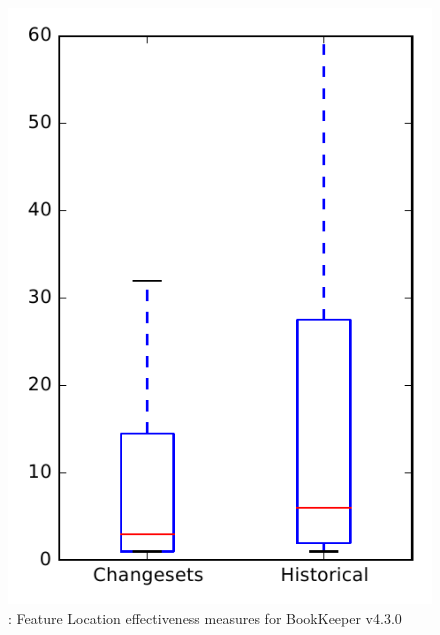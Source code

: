 
\begin{figure}
\centering
\includegraphics[height=0.4\textheight]{figures/flt/rq2_bookkeeper_no_outlier}
\caption{\ftwo: Feature Location effectiveness measures for BookKeeper v4.3.0}
\label{fig:flt:rq2:bookkeeper}
\end{figure}
